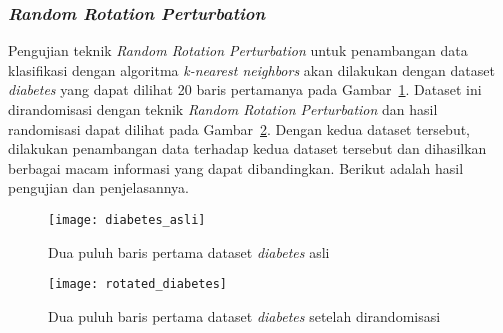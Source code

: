 \subsubsection{\textit{Random Rotation Perturbation}}
\label{subsubsec:pengujian-klasifikasi-rrp}

Pengujian teknik \textit{Random Rotation Perturbation} untuk penambangan data klasifikasi dengan algoritma \textit{k-nearest neighbors} akan dilakukan dengan dataset \textit{diabetes} yang dapat dilihat 20 baris pertamanya pada Gambar~\ref{fig:diabetes_asli}. Dataset ini dirandomisasi dengan teknik \textit{Random Rotation Perturbation} dan hasil randomisasi dapat dilihat pada Gambar~\ref{fig:rotated_diabetes}. Dengan kedua dataset tersebut, dilakukan penambangan data terhadap kedua dataset tersebut dan dihasilkan berbagai macam informasi yang dapat dibandingkan. Berikut adalah hasil pengujian dan penjelasannya.

\begin{figure}
	\centering
	\texttt{[image: diabetes\_asli]}
	\caption{Dua puluh baris pertama dataset \textit{diabetes} asli}
	\label{fig:diabetes_asli}
\end{figure}

\begin{figure}
	\centering
	\texttt{[image: rotated\_diabetes]}
	\caption{Dua puluh baris pertama dataset \textit{diabetes} setelah dirandomisasi}
	\label{fig:rotated_diabetes}
\end{figure}

